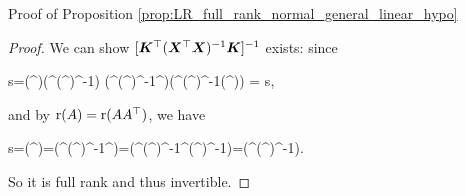 \documentclass[10pt,a4paper]{book}
\begin{document}
\begin{pfbox}{Proof of Proposition \ref{prop:LR_full_rank_normal_general_linear_hypo}}
\begin{proof}
	We can show $[{\boldsymbol K}^\top({\boldsymbol X}^\top {\boldsymbol X})^{-1}{\boldsymbol K}]^{-1}$ exists: since 
	\begin{sequation*}
		s=\rmr(\K^\TT)\geq \rmr(\K^\TT (\X^\TT\X)^{-1}) \geq \rmr(\K^\TT (\X^\TT\X)^{-1}\X^\TT)\geq \rmr(\K^\TT (\X^\TT\X)^{-1}(\X^\TT\X)) = s,
	\end{sequation*}
	and by $\mathrm{r}(A)=\mathrm{r}(AA^\top)$, 
	we have 
	\begin{sequation*}
		s=\rmr(\K^\TT)=\rmr(\K^\TT (\X^\TT\X)^{-1}\X^\TT)=\rmr(\K^\TT (\X^\TT\X)^{-1}\X^\TT\X(\X^\TT\X)^{-1}\K)=\rmr(\K^\TT(\X^\TT\X)^{-1}\K).
	\end{sequation*}
	So it is full rank and thus invertible.


\end{proof}
\end{pfbox}
\end{document}
